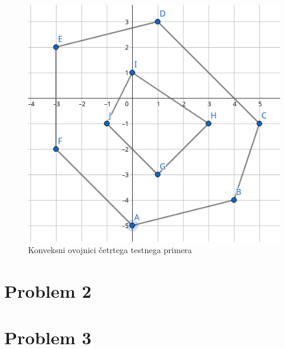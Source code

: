 \documentclass{article}
\begin{document}
\begin{figure}
	\centering
	\includegraphics[scale=0.4]{./figs/test04.png}
	\caption{Konveksni ovojnici četrtega testnega primera}
	\label{fig:test04}
\end{figure}

\section{Problem 2}

\section{Problem 3}



\end{document}
